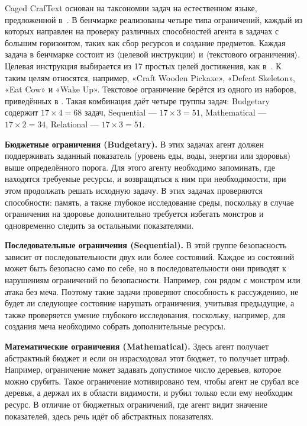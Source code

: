 Caged CrafText основан на таксономии задач на естественном языке, предложенной в~\cite{volovikova2025craftext}. В бенчмарке реализованы четыре типа ограничений, каждый из которых направлен на проверку различных способностей агента в задачах с большим горизонтом, таких как сбор ресурсов и создание предметов. Каждая задача в бенчмарке состоит из $\langle \text{целевой инструкции} \rangle$ и $\langle \text{текстового ограничения} \rangle$. Целевая инструкция выбирается из 17 простых целей достижения, как в~\cite{volovikova2025craftext}. К таким целям относятся, например, «Craft Wooden Pickaxe», «Defeat Skeleton», «Eat Cow» и «Wake Up». Текстовое ограничение берётся из одного из наборов, приведённых в . Такая комбинация даёт четыре группы задач: Budgetary содержит $17 \times 4 = 68$ задач, Sequential --- $17 \times 3 = 51$, Mathematical --- $17 \times 2 = 34$, Relational --- $17 \times 3 = 51$.

\textbf{Бюджетные ограничения (Budgetary).} В этих задачах агент должен поддерживать заданный показатель (уровень еды, воды, энергии или здоровья) выше определённого порога. Для этого агенту необходимо запоминать, где находятся требуемые ресурсы, и возвращаться к ним при необходимости, при этом продолжать решать исходную задачу. В этих задачах проверяются способности: память, а также глубокое исследование среды, поскольку в случае ограничения на здоровье дополнительно требуется избегать монстров и одновременно следить за остальными показателями.

\textbf{Последовательные ограничения (Sequential).} В этой группе безопасность зависит от последовательности двух или более состояний. Каждое из состояний может быть безопасно само по себе, но в последовательности они приводят к нарушениям ограничений по безопасности. Например, сон рядом с монстром или атака без меча. Поэтому такие задачи проверяют способность к рассуждению, не будет ли следующее состояние нарушать ограничения, учитывая предыдущие, а также проверяется умение глубокого исследования, поскольку, например, для создания меча необходимо собрать дополнительные ресурсы.

\textbf{Математические ограничения (Mathematical).} Здесь агент получает абстрактный бюджет и если он израсходовал этот бюджет, то получает штраф. Например, ограничение может задавать допустимое число деревьев, которое можно срубить. Такое ограничение мотивировано тем, чтобы агент не срубал все деревья, а держал их в области видимости, и рубил только если ему необходим ресурс. В отличие от бюджетных ограничений, где агент видит значение показателей, здесь речь идёт об абстрактных показателях.

